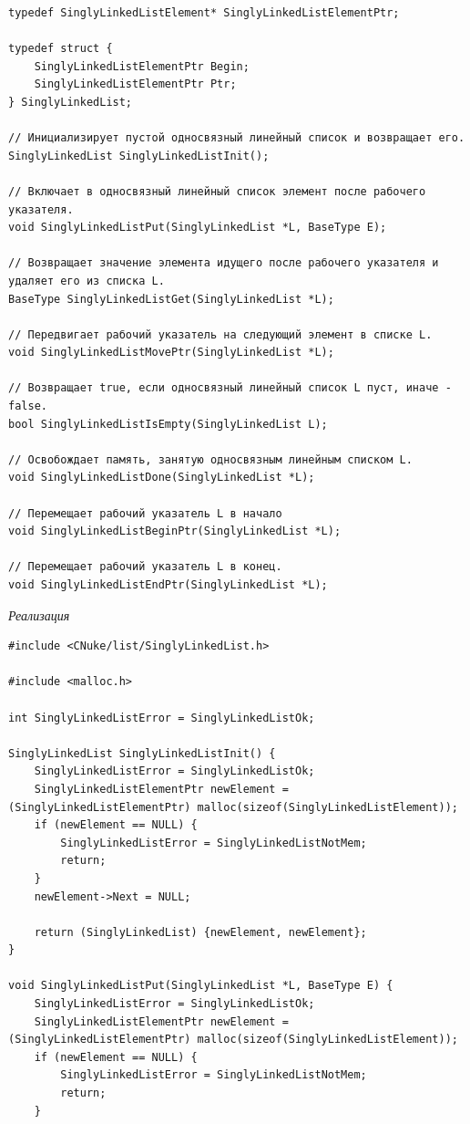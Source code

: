 \documentclass[a4paper,14pt]{extarticle}
\begin{document}
\begin{enumerate}
\begin{verbatim}
typedef SinglyLinkedListElement* SinglyLinkedListElementPtr;

typedef struct {
    SinglyLinkedListElementPtr Begin;
    SinglyLinkedListElementPtr Ptr;
} SinglyLinkedList;

// Инициализирует пустой односвязный линейный список и возвращает его.
SinglyLinkedList SinglyLinkedListInit();

// Включает в односвязный линейный список элемент после рабочего указателя.
void SinglyLinkedListPut(SinglyLinkedList *L, BaseType E);

// Возвращает значение элемента идущего после рабочего указателя и удаляет его из списка L.
BaseType SinglyLinkedListGet(SinglyLinkedList *L);

// Передвигает рабочий указатель на следующий элемент в списке L.
void SinglyLinkedListMovePtr(SinglyLinkedList *L);

// Возвращает true, если односвязный линейный список L пуст, иначе - false.
bool SinglyLinkedListIsEmpty(SinglyLinkedList L);

// Освобождает память, занятую односвязным линейным списком L.
void SinglyLinkedListDone(SinglyLinkedList *L);

// Перемещает рабочий указатель L в начало
void SinglyLinkedListBeginPtr(SinglyLinkedList *L);

// Перемещает рабочий указатель L в конец.
void SinglyLinkedListEndPtr(SinglyLinkedList *L);
    \end{verbatim}
    \textit{Реализация}
\begin{verbatim}
#include <CNuke/list/SinglyLinkedList.h>

#include <malloc.h>

int SinglyLinkedListError = SinglyLinkedListOk;

SinglyLinkedList SinglyLinkedListInit() {
    SinglyLinkedListError = SinglyLinkedListOk;
    SinglyLinkedListElementPtr newElement = (SinglyLinkedListElementPtr) malloc(sizeof(SinglyLinkedListElement));
    if (newElement == NULL) {
        SinglyLinkedListError = SinglyLinkedListNotMem;
        return;
    }
    newElement->Next = NULL;

    return (SinglyLinkedList) {newElement, newElement};
}

void SinglyLinkedListPut(SinglyLinkedList *L, BaseType E) {
    SinglyLinkedListError = SinglyLinkedListOk;
    SinglyLinkedListElementPtr newElement = (SinglyLinkedListElementPtr) malloc(sizeof(SinglyLinkedListElement));
    if (newElement == NULL) {
        SinglyLinkedListError = SinglyLinkedListNotMem;
        return;
    }


\end{verbatim}
\end{enumerate}
\end{document}
